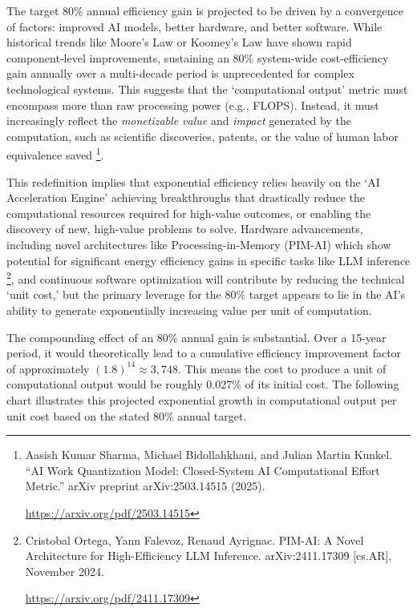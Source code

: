 \documentclass[fontsize=10pt, oneside, DIV=calc]{scrartcl}
\begin{document}
\noindent
The target 80\% annual efficiency gain is projected to be driven by a convergence of factors: improved AI models, better hardware, and better software. While historical trends like Moore's Law or Koomey's Law have shown rapid component-level improvements, sustaining an 80\% system-wide cost-efficiency gain annually over a multi-decade period is unprecedented for complex technological systems. This suggests that the `computational output' metric must encompass more than raw processing power (e.g., FLOPS). Instead, it must increasingly reflect the \textit{monetizable value} and \textit{impact} generated by the computation, such as scientific discoveries, patents, or the value of human labor equivalence saved \footnote{Aasish Kumar Sharma, Michael Bidollahkhani, and Julian Martin Kunkel. ``AI Work Quantization Model: Closed-System AI Computational Effort Metric.'' arXiv preprint arXiv:2503.14515 (2025).








\href{https://arxiv.org/pdf/2503.14515}\url{https://arxiv.org/pdf/2503.14515}}.

\medskip

\noindent
This redefinition implies that exponential efficiency relies heavily on the `AI Acceleration Engine' achieving breakthroughs that drastically reduce the computational resources required for high-value outcomes, or enabling the discovery of new, high-value problems to solve. Hardware advancements, including novel architectures like Processing-in-Memory (PIM-AI) which show potential for significant energy efficiency gains in specific tasks like LLM inference \footnote{Cristobal Ortega, Yann Falevoz, Renaud Ayrignac. PIM-AI: A Novel Architecture for High-Efficiency LLM Inference. arXiv:2411.17309 [cs.AR], November 2024.








\href{https://arxiv.org/pdf/2411.17309}\url{https://arxiv.org/pdf/2411.17309}}, and continuous software optimization will contribute by reducing the technical `unit cost,' but the primary leverage for the 80\% target appears to lie in the AI's ability to generate exponentially increasing value per unit of computation.

\medskip

\noindent
The compounding effect of an 80\% annual gain is substantial. Over a 15-year period, it would theoretically lead to a cumulative efficiency improvement factor of approximately \((1.8)^{14} \approx 3,748\). This means the cost to produce a unit of computational output would be roughly 0.027\% of its initial cost. The following chart illustrates this projected exponential growth in computational output per unit cost based on the stated 80\% annual target.
\end{document}
